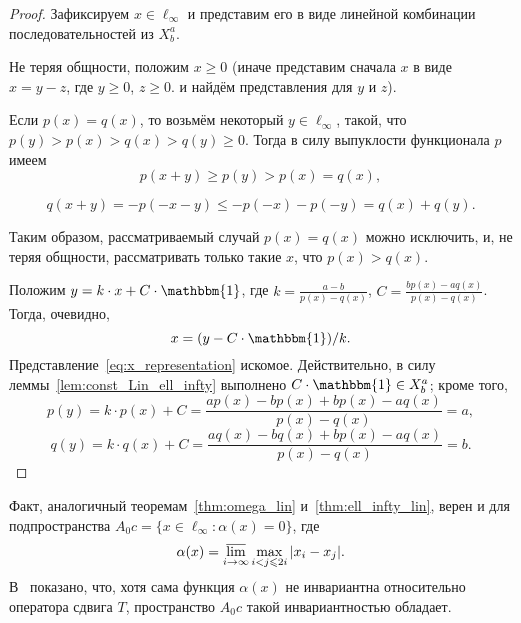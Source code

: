 \documentclass[a4paper,14pt]{article} %
\theoremstyle{plain}
\begin{document}
\begin{proof}
	Зафиксируем $x \in \ell_\infty$ и представим его в виде линейной комбинации последовательностей из $X^a_b$.

	Не теряя общности, положим $x\geq 0$
	(иначе представим сначала $x$ в виде $x = y - z$, где $y \geq 0$, $z \geq 0$.
	и найдём представления для $y$ и $z$).

	Если $p(x) = q(x)$, то возьмём некоторый $y\in\ell_\infty$,
	такой, что $p(y) > p(x) > q(x)  > q(y) \geq 0$.
	Тогда в силу выпуклости функционала $p$ имеем
	\begin{equation}
		p(x+y) \geq p(y) > p(x) = q(x)
		,
	\end{equation}


	\begin{equation}
		q(x+y) = -p(-x-y) \leq -p(-x) -p(-y) = q(x) + q(y)
		.
	\end{equation}

	Таким образом, рассматриваемый случай $p(x) = q(x)$ можно исключить,
	и, не теряя общности, рассматривать только такие $x$, что $p(x) > q(x)$.

	Положим $y=k\cdot x + C\cdot\mathbbm{1}$,
	где $k=\frac{a-b}{p(x)-q(x)}$, $C=\frac{bp(x)-aq(x)}{p(x)-q(x)}$.
	Тогда, очевидно,
	\begin{equation}
		\label{eq:x_representation}
		x=(y-C\cdot\mathbbm{1})/k
		.
	\end{equation}
	Представление~\eqref{eq:x_representation} искомое.
	Действительно, в силу леммы~\ref{lem:const_Lin_ell_infty} выполнено
	$C\cdot\mathbbm{1}\in X^a_b$; кроме того,
	\begin{equation}
		p(y) = k\cdot p(x) + C
		=
		\frac{ap(x)-bp(x)+bp(x)-aq(x)}{p(x)-q(x)}
		=
		a
		,
	\end{equation}
	\begin{equation}
		q(y) = k\cdot q(x) + C
		=
		\frac{aq(x)-bq(x)+bp(x)-aq(x)}{p(x)-q(x)}
		=
		b
		.
	\end{equation}
\end{proof}

Факт, аналогичный теоремам~\ref{thm:omega_lin} и~\ref{thm:ell_infty_lin}, верен и для подпространства
$A_0 c = \{ x \in \ell_\infty : \alpha(x) =0 \}$,
где~\cite{our-vzms-2018}
\begin{equation*}
	\alpha(x) = \varlimsup_{i\to\infty} \max_{i<j\leqslant 2i} |x_i - x_j|
	.
\end{equation*}
В~\cite{our-ped-2018-alpha-Tx} показано, что, хотя сама функция $\alpha(x)$ не инвариантна относительно оператора сдвига $T$,
пространство $A_0 c$ такой инвариантностью обладает.
\end{document}
